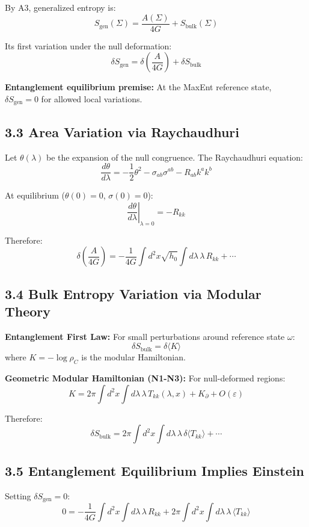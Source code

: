 By A3, generalized entropy is: \[S_{\text{gen}}(\Sigma) = \frac{A(\Sigma)}{4G} + S_{\text{bulk}}(\Sigma)\]

Its first variation under the null deformation: \[\delta S_{\text{gen}} = \delta\left(\frac{A}{4G}\right) + \delta S_{\text{bulk}}\]

\textbf{Entanglement equilibrium premise:} At the MaxEnt reference state, \(\delta S_{\text{gen}} = 0\) for allowed local variations.

\subsection{3.3 Area Variation via Raychaudhuri}\label{33-area-variation-via-raychaudhuri}

Let \(\theta(\lambda)\) be the expansion of the null congruence. The Raychaudhuri equation: \[\frac{d\theta}{d\lambda} = -\frac{1}{2}\theta^2 - \sigma_{ab}\sigma^{ab} - R_{ab}k^a k^b\]

At equilibrium (\(\theta(0) = 0\), \(\sigma(0) = 0\)): \[\left.\frac{d\theta}{d\lambda}\right|_{\lambda=0} = -R_{kk}\]

Therefore: \[\delta\left(\frac{A}{4G}\right) = -\frac{1}{4G}\int d^2x \sqrt{h_0} \int d\lambda \, \lambda \, R_{kk} + \cdots\]

\subsection{3.4 Bulk Entropy Variation via Modular Theory}\label{34-bulk-entropy-variation-via-modular-theory}

\textbf{Entanglement First Law:} For small perturbations around reference state \(\omega\): \[\delta S_{\text{bulk}} = \delta\langle K \rangle\] where \(K = -\log \rho_C\) is the modular Hamiltonian.

\textbf{Geometric Modular Hamiltonian (N1-N3):} For null-deformed regions: \[K = 2\pi \int d^2x \int d\lambda \, \lambda \, T_{kk}(\lambda, x) + K_\partial + O(\varepsilon)\]

Therefore: \[\delta S_{\text{bulk}} = 2\pi \int d^2x \int d\lambda \, \lambda \, \delta\langle T_{kk} \rangle + \cdots\]

\subsection{3.5 Entanglement Equilibrium Implies Einstein}\label{35-entanglement-equilibrium-implies-einstein}

Setting \(\delta S_{\text{gen}} = 0\): \[0 = -\frac{1}{4G}\int d^2x \int d\lambda \, \lambda \, R_{kk} + 2\pi \int d^2x \int d\lambda \, \lambda \, \langle T_{kk} \rangle\]

